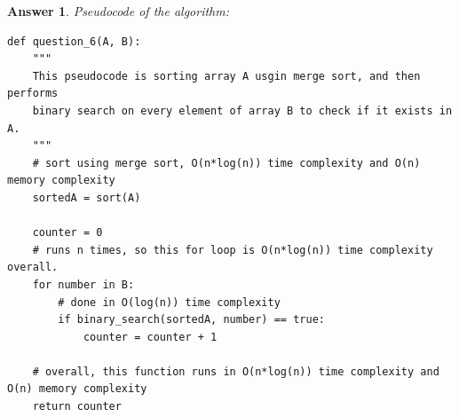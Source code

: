 \documentclass[a4paper]{article}
\theoremstyle{remarksStyle}
\theoremstyle{questionStyle}
\theoremstyle{answerStyle}
\newtheorem{answer}{Answer}
\begin{document}
\begin{answer}
    Pseudocode of the algorithm:
\begin{verbatim}
def question_6(A, B):
    """
    This pseudocode is sorting array A usgin merge sort, and then performs
    binary search on every element of array B to check if it exists in A.
    """
    # sort using merge sort, O(n*log(n)) time complexity and O(n) memory complexity
    sortedA = sort(A) 
    
    counter = 0
    # runs n times, so this for loop is O(n*log(n)) time complexity overall.
    for number in B: 
        # done in O(log(n)) time complexity
        if binary_search(sortedA, number) == true: 
            counter = counter + 1

    # overall, this function runs in O(n*log(n)) time complexity and O(n) memory complexity
    return counter 
        
\end{verbatim}
\end{answer}

\newpage
\end{document}
